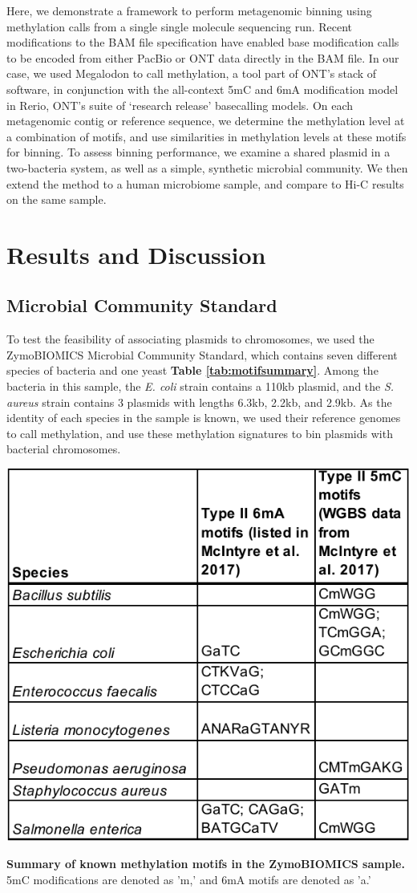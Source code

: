 Here, we demonstrate a framework to perform metagenomic binning using methylation calls from a single single molecule sequencing run. Recent modifications to the BAM file specification have enabled base modification calls to be encoded from either PacBio or ONT data directly in the BAM file.  In our case, we used Megalodon to call methylation, a tool part of ONT’s stack of software, in conjunction with the all-context 5mC and 6mA modification model in Rerio, ONT’s suite of ‘research release’ basecalling models. On each metagenomic contig or reference sequence, we determine the methylation level at a combination of motifs, and use similarities in methylation levels at these motifs for binning. To assess binning performance, we examine a shared plasmid in a two-bacteria system, as well as a simple, synthetic microbial community. We then extend the method to a human microbiome sample, and compare to Hi-C results on the same sample.


\section{Results and Discussion}
\label{sec:results}

\subsection{Microbial Community Standard}
\label{sec:zymo}

To test the feasibility of associating plasmids to chromosomes, we used the ZymoBIOMICS Microbial Community Standard, which contains seven different species of bacteria and one yeast {\bf Table \ref{tab:motifsummary}}. Among the bacteria in this sample, the \textit{E. coli} strain contains a 110kb plasmid, and the \textit{S. aureus} strain contains 3 plasmids with lengths 6.3kb, 2.2kb, and 2.9kb. As the identity of each species in the sample is known, we used their reference genomes to call methylation, and use these methylation signatures to bin plasmids with bacterial chromosomes.




\begin{table}[!hb]
\centering
\includegraphics[width = .5\linewidth,keepaspectratio]{figure/motifsummary.pdf}
\caption[Summary of known methylation motifs in the ZymoBIOMICS sample]{{\bf Summary of known methylation motifs in the ZymoBIOMICS sample.} 5mC modifications are denoted as 'm,' and 6mA motifs are denoted as 'a.' }
\label{tab:motifsummary}
\end{table}



